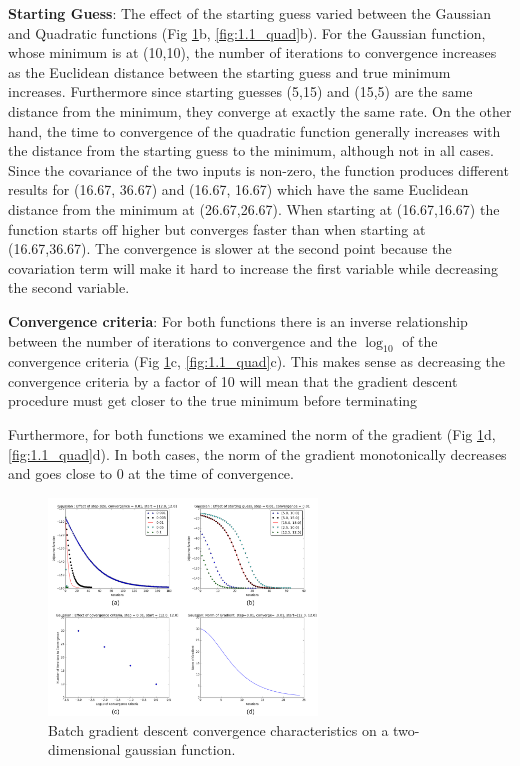 \documentclass[10pt, twocolumn]{article}
\begin{document}
  \textbf{Starting Guess}: The effect of the starting guess varied between the Gaussian and Quadratic functions (Fig \ref{fig:1.1_gauss}b, \ref{fig:1.1_quad}b). For the Gaussian function, whose minimum is at (10,10), the number of iterations to convergence increases as the Euclidean distance between the starting guess and true minimum increases. Furthermore since starting guesses (5,15) and (15,5) are the same distance from the minimum, they converge at exactly the same rate. On the other hand, the time to convergence of the quadratic function generally increases with the distance from the starting guess to the minimum, although not in all cases. Since the covariance of the two inputs is non-zero, the function produces different results for (16.67, 36.67) and (16.67, 16.67) which have the same Euclidean distance from the minimum at (26.67,26.67). When starting at (16.67,16.67) the function starts off higher but converges faster than when starting at (16.67,36.67). The convergence is slower at the second point because the covariation term will make it hard to increase the first variable while decreasing the second variable. 
  
\textbf{Convergence criteria}: For both functions there is an inverse relationship between the number of iterations to convergence and the $\log_{10}$ of the convergence criteria (Fig \ref{fig:1.1_gauss}c, \ref{fig:1.1_quad}c). This makes sense as decreasing the convergence criteria by a factor of 10 will mean that the gradient descent procedure must get closer to the true minimum before terminating

\medskip
Furthermore, for both functions we examined the norm of the gradient (Fig \ref{fig:1.1_gauss}d, \ref{fig:1.1_quad}d). In both cases, the norm of the gradient monotonically decreases and goes close to 0 at the time of convergence.

\begin{figure}
\caption{Batch gradient descent convergence characteristics on a two-dimensional gaussian function.}
\begin{center}
\includegraphics[width=270px]{all_gaussian_gd}
\end{center}
\label{fig:1.1_gauss}
\end{figure}
\end{document}
